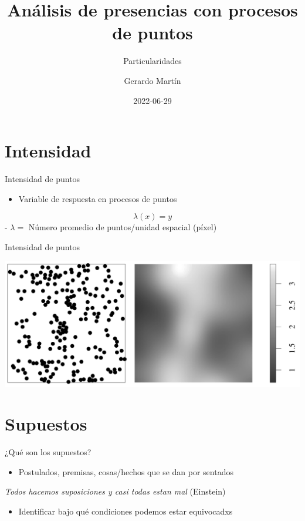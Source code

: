 \documentclass[
  11pt,
  ignorenonframetext,
]{beamer}
\title{Análisis de presencias con procesos de puntos}
\subtitle{Particularidades}
\author{Gerardo Martín}
\date{2022-06-29}
\providecommand{\tightlist}{%
  \setlength{\itemsep}{0pt}\setlength{\parskip}{0pt}}
\begin{document}
\frame{\titlepage}

\hypertarget{intensidad}{%
\section{Intensidad}\label{intensidad}}

\begin{frame}{Intensidad de puntos}
\protect\hypertarget{intensidad-de-puntos}{}
\begin{itemize}
\tightlist
\item
  Variable de respuesta en procesos de puntos
\end{itemize}

\[\lambda(x) = y\] - \(\lambda=\) Número promedio de puntos/unidad
espacial (píxel)
\end{frame}

\begin{frame}{Intensidad de puntos}
\protect\hypertarget{intensidad-de-puntos-1}{}
\begin{center}\includegraphics{Figuras/Intensidad} \end{center}
\end{frame}

\hypertarget{supuestos}{%
\section{Supuestos}\label{supuestos}}

\begin{frame}{¿Qué son los supuestos?}
\protect\hypertarget{quuxe9-son-los-supuestos}{}
\begin{itemize}
\tightlist
\item
  Postulados, premisas, cosas/hechos que se dan por sentados
\end{itemize}

\emph{Todos hacemos suposiciones y casi todas estan mal} (Einstein)

\begin{itemize}
\tightlist
\item
  Identificar bajo qué condiciones podemos estar equivocadxs
\end{itemize}
\end{frame}
\end{document}
